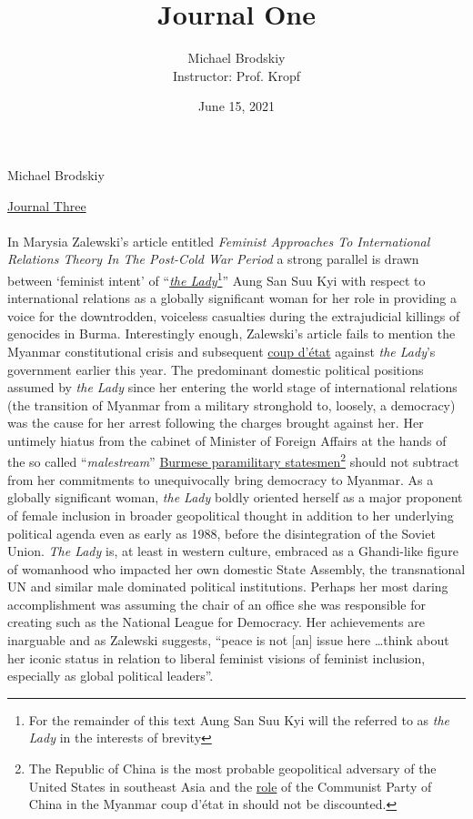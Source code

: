 \documentclass[12pt]{article}
\title{Journal One}
\date{June 15, 2021}
\author{Michael Brodskiy\\ \small Instructor: Prof. Kropf}
\begin{document}
\flushleft Michael Brodskiy

\begin{center}

\underline{Journal Three}

\end{center}

\begin{justify}

  \paragraph{} In Marysia Zalewski's article entitled \emph{Feminist Approaches To International Relations Theory In The Post-Cold War Period} a strong parallel is drawn between `feminist intent' of “\emph{\underline{the Lady}}\footnote{For the remainder of this text Aung San Suu Kyi will the referred to as \emph{the Lady} in the interests of brevity}” Aung San Suu Kyi with respect to international relations as a globally significant woman for her role in providing a voice for the downtrodden, voiceless casualties during the extrajudicial killings of genocides in Burma. Interestingly enough, Zalewski's article fails to mention the Myanmar constitutional crisis and subsequent \href{https://en.wikipedia.org/wiki/2021\_Myanmar\_coup\_d\%27\%C\3\%A9tat}{coup d'\'etat} against \emph{the Lady}'s government earlier this year. The predominant domestic political positions assumed by \emph{the Lady} since her entering the world stage of international relations (the transition of Myanmar from a military stronghold to, loosely, a democracy) was the cause for her arrest following the charges brought against her. Her untimely hiatus from the cabinet of Minister of Foreign Affairs at the hands of the so called “\emph{malestream}” \underline{Burmese paramilitary statesmen}\footnote{The Republic of China is the most probable geopolitical adversary of the United States in southeast Asia and the \href{https://intelnews.org/2021/02/04/01-2949/}{role} of the Communist Party of China in the Myanmar coup d'\'etat in should not be discounted.} should not subtract from her commitments to unequivocally bring democracy to Myanmar. As a globally significant woman, \emph{the Lady} boldly oriented herself as a major proponent of female inclusion in broader geopolitical thought in addition to her underlying political agenda even as early as 1988, before the disintegration of the Soviet Union. \emph{The Lady} is, at least in western culture, embraced as a Ghandi-like figure of womanhood who impacted her own domestic State Assembly, the transnational UN and similar male dominated political institutions. Perhaps her most daring accomplishment was assuming the chair of an office she was responsible for creating such as the National League for Democracy. Her achievements are inarguable and as Zalewski suggests, “peace is not [an] issue here \dots think about her iconic status in relation to liberal feminist visions of feminist inclusion, especially as global political leaders”.

\end{justify}
\end{document}
